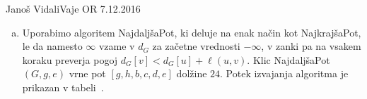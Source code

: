 \begin{naloga}{Janoš Vidali}{Vaje OR 7.12.2016}
\begin{odgovor}
\begin{enumerate}[(a)]
Pripomnimo, da algoritem deluje pravilno
ne glede na položaj začetnega vozlišča $s$ v topološki ureditvi.
Za vsako vozlišče $u$, ki v topološki ureditvi nastopa pred $s$,
namreč velja $d_G(u) = \infty$,
tako da se ne nastavi kot predhodnik nobenemu vozlišču.
Tako se vozlišču $s$ ne bo nastavil predhodnik.
Algoritem lahko nekoliko pohitrimo tako,
da gledamo vozlišča v topološki ureditvi le od $s$ naprej,
prejšnja pa ignoriramo, saj iz $s$ ne moremo priti do njih.
Prav tako bi se lahko ustavili, ko dosežemo vozlišče $t$.

\item Uporabimo algoritem {\sc NajdaljšaPot},
ki deluje na enak način kot {\sc NajkrajšaPot},
le da namesto $\infty$ vzame v $d_G$ za začetne vrednosti $-\infty$,
v zanki pa na vsakem koraku preverja pogoj $d_G[v] < d_G[u] + \ell(u, v)$.
Klic {\sc NajdaljšaPot}$(G, g, e)$ vrne pot $[g, h, b, c, d, e]$ dolžine $24$.
Potek izvajanja algoritma je prikazan v tabeli~.
\end{enumerate}


\end{odgovor}
\end{naloga}
